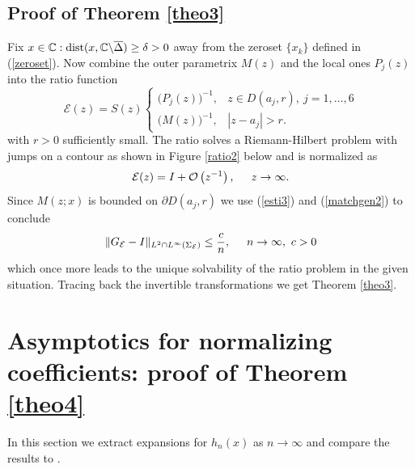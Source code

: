 \documentclass[10pt,oneside,reqno]{amsart}
\numberwithin{equation}{section}
\def\eqref#1{(\ref{#1})}
\begin{document}
\subsection{Proof of Theorem \ref{theo3}}\label{secgen22} Fix $x\in\mathbb{C}:\textnormal{dist}(x,\mathbb{C}\backslash\overline{\Delta})\geq\delta>0$
away from the zeroset $\{x_k\}$ defined in \eqref{zeroset}. Now combine the outer parametrix $M(z)$ and the local ones $P_j(z)$ into the ratio function
\begin{equation*}
{\mathcal E}(z)= S(z)\begin{cases}
                         \big(P_j(z)\big)^{-1},& z\in D(a_j,r),\ j=1,\ldots,6\\
\big(M(z)\big)^{-1},&|z-a_j|>r.
                        \end{cases}
\end{equation*}
with $r>0$ sufficiently small. The ratio solves a Riemann-Hilbert problem with jumps on a contour as shown in Figure \ref{ratio2} below and is normalized as
\begin{equation*}
  {\mathcal E}(z)=I+\mathcal O\left(z^{-1}\right),\hspace{0.5cm}z\rightarrow\infty.
\end{equation*}
Since $M(z;x)$ is bounded on $\partial D(a_j,r)$ we use \eqref{esti3} and \eqref{matchgen2} to conclude
\begin{equation*}
  \|G_{\mathcal E}-I\|_{L^2\cap L^{\infty}(\Sigma_{\mathcal E})}\leq\frac{c}{n},\hspace{0.5cm}n\rightarrow\infty,\ c>0
\end{equation*}
which once more leads to the unique solvability of the ratio problem in the given situation. Tracing back the invertible transformations we get Theorem \ref{theo3}.

\section{Asymptotics for normalizing coefficients: proof of Theorem \ref{theo4}}\label{sec5}
In this section we extract expansions for $h_n(x)$ as $n\rightarrow\infty$ and compare the results to \cite{BM}.
\end{document}
